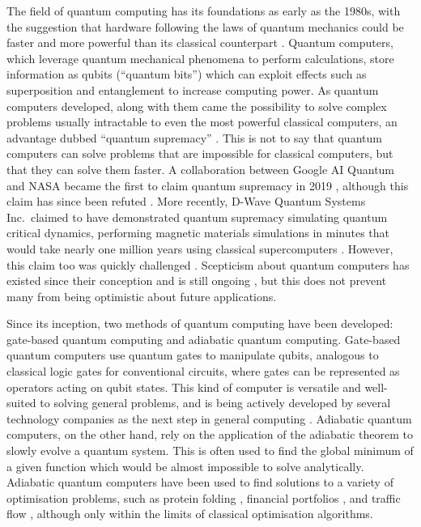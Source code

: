\documentclass[twocolumn]{article}
\theoremstyle{definition}
\begin{document}
The field of quantum computing has its foundations as early as the 1980s, with the suggestion that hardware following the laws of quantum mechanics could be faster and more powerful than its classical counterpart \cite{feynman_simulating_1982}.
Quantum computers, which leverage quantum mechanical phenomena to perform calculations, store information as qubits (``quantum bits'') which can exploit effects such as superposition and entanglement to increase computing power.
As quantum computers developed, along with them came the possibility to solve complex problems usually intractable to even the most powerful classical computers, an advantage dubbed ``quantum supremacy'' \cite{preskill_supremacy_2012}. This is not to say that quantum computers can solve problems that are impossible for classical computers, but that they can solve them faster. A collaboration between Google AI Quantum and NASA became the first to claim quantum supremacy in 2019 \cite{arute_quantum_2019}, although this claim has since been refuted \cites{pednault_leveraging_2019}{mccormick_race_2022}. More recently, D-Wave Quantum Systems Inc.\ claimed to have demonstrated quantum supremacy simulating quantum critical dynamics, performing magnetic materials simulations in minutes that would take nearly one million years using classical supercomputers \cite{king_beyond_2025}. However, this claim too was quickly challenged \cites{tindall_dynamics_2025}{mauron_challenging_2025}. Scepticism about quantum computers has existed since their conception \cite{unruh_maintaining_1995} and is still ongoing \cite{brooks_quantum_2023}, but this does not prevent many from being optimistic about future applications.

Since its inception, two methods of quantum computing have been developed: gate-based quantum computing and adiabatic quantum computing.
Gate-based quantum computers use quantum gates to manipulate qubits, analogous to classical logic gates for conventional circuits, where gates can be represented as operators acting on qubit states. This kind of computer is versatile and well-suited to solving general problems, and is being actively developed by several technology companies as the next step in general computing \cites{google}{ibm}.
Adiabatic quantum computers, on the other hand, rely on the application of the adiabatic theorem to slowly evolve a quantum system. This is often used to find the global minimum of a given function which would be almost impossible to solve analytically. Adiabatic quantum computers have been used to find solutions to a variety of optimisation problems, such as protein folding \cite{perdomo-ortiz_protein_2012}, financial portfolios \cite{phillipson_portfolio_2021}, and traffic flow \cite{inoue_traffic_2021}, although only within the limits of classical optimisation algorithms.
\end{document}
